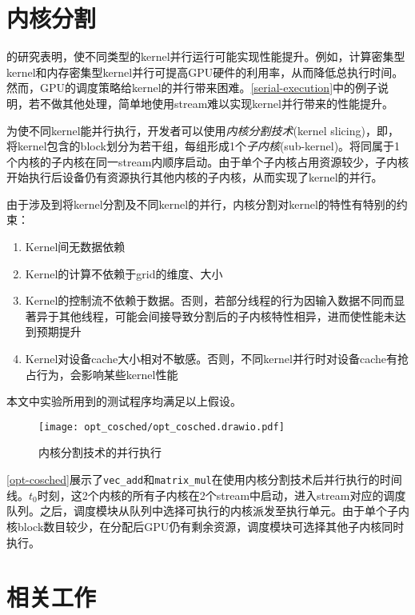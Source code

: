 \section{内核分割}

\citet{10.1145_3295690}\cite{8853389}的研究表明，使不同类型的kernel并行运行可能实现性能提升。例如，计算密集型kernel和内存密集型kernel并行可提高GPU硬件的利用率，从而降低总执行时间。然而，GPU的调度策略给kernel的并行带来困难。\autoref{serial-execution}中的例子说明，若不做其他处理，简单地使用stream难以实现kernel并行带来的性能提升。

为使不同kernel能并行执行，开发者可以使用\emph{内核分割技术}(kernel slicing)，即，将kernel包含的block划分为若干组，每组形成1个\emph{子内核}(sub-kernel)。将同属于1个内核的子内核在同一stream内顺序启动。由于单个子内核占用资源较少，子内核开始执行后设备仍有资源执行其他内核的子内核，从而实现了kernel的并行。

由于涉及到将kernel分割及不同kernel的并行，内核分割对kernel的特性有特别的约束：
\begin{enumerate}
    \item Kernel间无数据依赖
    \item Kernel的计算不依赖于grid的维度、大小
    \item Kernel的控制流不依赖于数据。否则，若部分线程的行为因输入数据不同而显著异于其他线程，可能会间接导致分割后的子内核特性相异，进而使性能未达到预期提升
    \item Kernel对设备cache大小相对不敏感。否则，不同kernel并行时对设备cache有抢占行为，会影响某些kernel性能
\end{enumerate}

本文中实验所用到的测试程序均满足以上假设。

\begin{figure}[htbp]
    \centering
    \texttt{[image: opt\_cosched/opt\_cosched.drawio.pdf]}
    \caption{内核分割技术的并行执行}
    \label{opt-cosched}    
\end{figure}

\autoref{opt-cosched}展示了\texttt{vec\_add}和\texttt{matrix\_mul}在使用内核分割技术后并行执行的时间线。$t_0$时刻，这2个内核的所有子内核在2个stream中启动，进入stream对应的调度队列。之后，调度模块从队列中选择可执行的内核派发至执行单元。由于单个子内核block数目较少，在分配后GPU仍有剩余资源，调度模块可选择其他子内核同时执行。

\section{相关工作}

